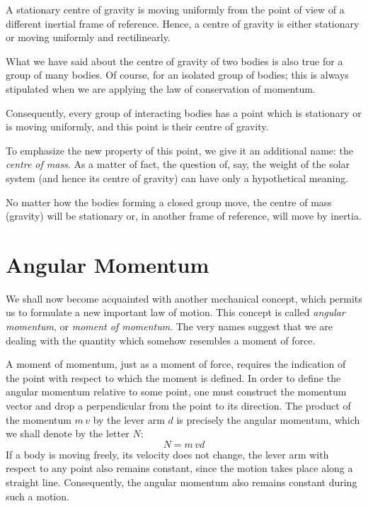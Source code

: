 A stationary centre of gravity is moving uniformly from the point of view of a different inertial frame of reference. Hence, a centre of gravity is either stationary or moving uniformly and rectilinearly.

What we have said about the centre of gravity of two bodies is also true for a group of many bodies. Of course, for an isolated group of bodies; this is always stipulated when we are applying the law of conservation of momentum.

Consequently, every group of interacting bodies has a point which is stationary or is moving uniformly, and this point is their centre of gravity.

To emphasize the new property of this point, we give it an additional name: the \emph{centre of mass}. As a matter of fact, the question of, say, the weight of the solar system (and hence its centre of gravity) can have only a hypothetical meaning.

No matter how the bodies forming a closed group move, the centre of mass (gravity) will be stationary or, in another frame of reference, will move by inertia.

\section{Angular Momentum}

We shall now become acquainted with another mechanical concept, which permits us to formulate a new important law of motion. This concept is called \emph{angular momentum}, or \emph{moment of momentum}. The very names suggest that we are dealing with the quantity which somehow resembles a moment of force.

A moment of momentum, just as a moment of force, requires the indication of the point with respect to which the moment is defined. In order to define the angular momentum relative to some point, one must construct the momentum vector and drop a perpendicular from the point to its direction. The product of the momentum $m \, v$ by the lever arm $d$ is precisely the angular momentum, which we shall denote by the letter $N$:
 \begin{equation*}%
N = m \, v d
 \end{equation*}
If a body is moving freely, its velocity does not change, the lever arm with respect to any point also remains constant, since the motion takes place along a straight line. Consequently, the angular momentum also remains constant during such a motion.

